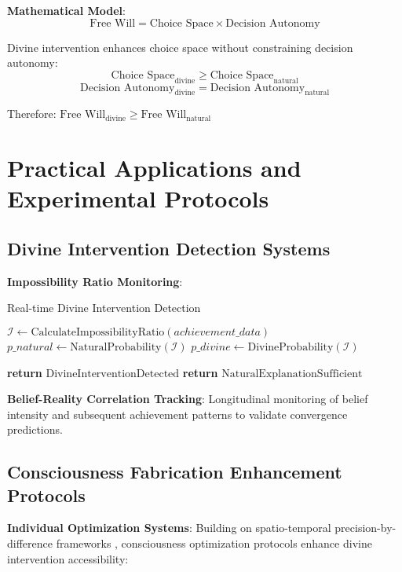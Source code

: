 \documentclass[12pt,a4paper]{article}
\begin{document}
\textbf{Mathematical Model}:
$$\text{Free Will} = \text{Choice Space} \times \text{Decision Autonomy}$$

Divine intervention enhances choice space without constraining decision autonomy:
$$\text{Choice Space}_{\text{divine}} \geq \text{Choice Space}_{\text{natural}}$$
$$\text{Decision Autonomy}_{\text{divine}} = \text{Decision Autonomy}_{\text{natural}}$$

Therefore: $\text{Free Will}_{\text{divine}} \geq \text{Free Will}_{\text{natural}}$

\section{Practical Applications and Experimental Protocols}

\subsection{Divine Intervention Detection Systems}

\textbf{Impossibility Ratio Monitoring}:
\begin{algorithm}
\caption{Real-time Divine Intervention Detection}
\begin{algorithmic}[1]
    \State $\mathcal{I} \leftarrow \text{CalculateImpossibilityRatio}(achievement\_data)$
    \State $p\_natural \leftarrow \text{NaturalProbability}(\mathcal{I})$
    \State $p\_divine \leftarrow \text{DivineProbability}(\mathcal{I})$
    
        \State \textbf{return} $\text{DivineInterventionDetected}$
    \Else
        \State \textbf{return} $\text{NaturalExplanationSufficient}$
    \EndIf
\EndProcedure
\end{algorithmic}
\end{algorithm}

\textbf{Belief-Reality Correlation Tracking}:
Longitudinal monitoring of belief intensity and subsequent achievement patterns to validate convergence predictions.

\subsection{Consciousness Fabrication Enhancement Protocols}

\textbf{Individual Optimization Systems}:
Building on spatio-temporal precision-by-difference frameworks \citep{sachikonye2024individual}, consciousness optimization protocols enhance divine intervention accessibility:
\end{document}
